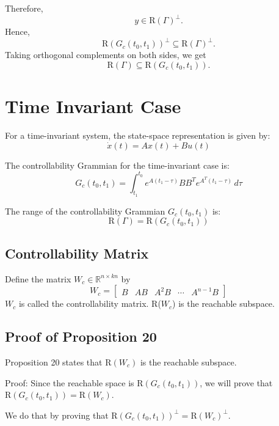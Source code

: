 \documentclass{article}
\begin{document}
Therefore,
\[
y \in \text{R}(\Gamma)^\perp.
\]
Hence,
\[
\text{R}(G_c(t_0, t_1))^\perp \subseteq \text{R}(\Gamma)^\perp.
\]
Taking orthogonal complements on both sides, we get
\[
\text{R}(\Gamma) \subseteq \text{R}(G_c(t_0, t_1)).
\]

\section{Time Invariant Case}
For a time-invariant system, the state-space representation is given by:
\[
\dot{x}(t) = Ax(t) + Bu(t)
\]

The controllability Grammian for the time-invariant case is:
\[
G_c(t_0, t_1) = \int_{t_1}^{t_0} e^{A(t_1 - \tau)} B B^T e^{A^T(t_1 - \tau)} \, d\tau
\]

The range of the controllability Grammian $G_c(t_0, t_1)$ is:
\[
\text{R}(\Gamma) = \text{R}(G_c(t_0, t_1))
\]

\subsection{Controllability Matrix}
Define the matrix $W_c \in \mathbb{R}^{n \times kn}$ by
\[
W_c = \begin{bmatrix}
B & AB & A^2B & \cdots & A^{n-1}B
\end{bmatrix}
\]
$W_c$ is called the controllability matrix. R($W_c$) is the reachable subspace.

\subsection{Proof of Proposition 20}
Proposition 20 states that $\text{R}(W_c)$ is the reachable subspace.

Proof: Since the reachable space is $\text{R}(G_c(t_0, t_1))$, we will prove that $\text{R}(G_c(t_0, t_1)) = \text{R}(W_c)$.

We do that by proving that $\text{R}(G_c(t_0, t_1))^\perp = \text{R}(W_c)^\perp$.
\end{document}

